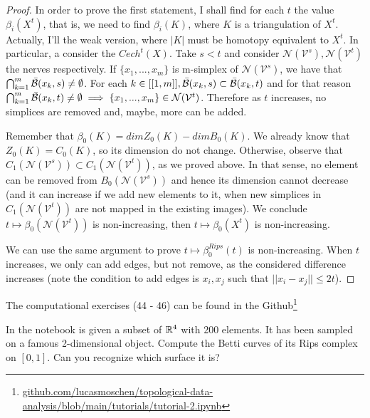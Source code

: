 \begin{proof}


In order to prove the first statement, I shall find for each $t$ the value
$\beta_i(X^t)$, that is, we need to find $\beta_i(K)$, where $K$ is a
triangulation of $X^t$. Actually, I'll the weak version, where $|K|$ must be
homotopy equivalent to $X^t$. In particular, a consider the $Cech^t(X)$. Take
$s < t$ and consider $\mathcal{N}(\mathcal{V}^s), \mathcal{N}(\mathcal{V}^t)$
the nerves respectively. If $\{x_1, ..., x_m\}$ is m-simplex of
$\mathcal{N}(\mathcal{V}^s)$, we have that $\bigcap_{k=1}^m \bar{\mathcal{B}}(x_k, s)
\neq \emptyset$. For each $k \in [[1,m]], \bar{\mathcal{B}}(x_k, s) \subset
\bar{\mathcal{B}}(x_k, t)$ and for that reason  $\bigcap_{k=1}^m \bar{\mathcal{B}}(x_k, t)
\neq \emptyset \implies \{x_1, ..., x_m\} \in \mathcal{N}(\mathcal{V}^t)$.
Therefore as $t$ increases, no simplices are removed and, maybe, more can be
added. 

Remember that $\beta_0(K) = dim Z_0(K) - dim B_0(K)$. We already know that
$Z_0(K) = C_0(K)$, so its dimension do not change. Otherwise, observe that
$C_1(\mathcal{N}(\mathcal{V}^s)) \subset C_1(\mathcal{N}(\mathcal{V}^t))$, as we
proved above. In that sense, no element can be removed from
$B_0(\mathcal{N}(\mathcal{V}^s))$ and hence its dimension cannot decrease (and
it can increase if we add new elements to it, when new simplices in
$C_1(\mathcal{N}(\mathcal{V}^t))$ are not mapped in the existing images). We
conclude $t \mapsto \beta_0(\mathcal{N}(\mathcal{V}^t))$ is non-increasing,
then $t \mapsto \beta_0(X^t)$ is non-increasing. 

We can use the same argument to prove $t \mapsto \beta_0^{Rips}(t)$ is
non-increasing. When $t$ increases, we only can add edges, but not remove, as
the considered difference increases (note the condition to add edges is $x_i,
x_j$ such that $||x_i - x_j|| \le 2t$).  
    
\end{proof}

\noindent\linia

The computational exercises (44 - 46) can be found in the
Github\footnote{\url{github.com/lucasmoschen/topological-data-analysis/blob/main/tutorials/tutorial-2.ipynb}}

\begin{exercise}
    In the notebook is given a subset of $\mathbb{R}^4$ with 200 elements. It has been
    sampled on a famous 2-dimensional object. Compute the Betti curves of its
    Rips complex on $[0, 1]$. Can you recognize which surface it is?
\end{exercise}

